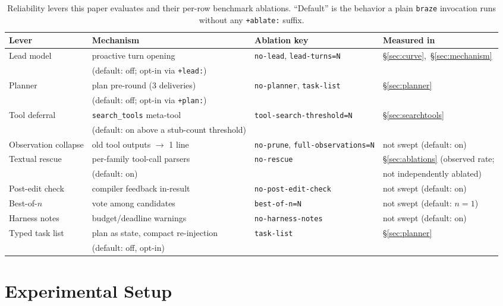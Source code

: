 \documentclass[smallcondensed,natbib]{svjour3}
\begin{document}
\begin{table}[t]
\centering\small
\caption{Reliability levers this paper evaluates and their per-row
benchmark ablations. ``Default'' is the behavior a plain \texttt{braze}
invocation runs without any \texttt{+ablate:} suffix.}
\label{tab:levers}
\begin{tabular}{llll}
\toprule
Lever & Mechanism & Ablation key & Measured in \\
\midrule
Lead model & proactive turn opening & \texttt{no-lead}, \texttt{lead-turns=N} & \S\ref{sec:curve},~\S\ref{sec:mechanism} \\
& (default: off; opt-in via \texttt{+lead:}) & & \\
Planner & plan pre-round (3 deliveries) & \texttt{no-planner}, \texttt{task-list} & \S\ref{sec:planner} \\
& (default: off; opt-in via \texttt{+plan:}) & & \\
Tool deferral & \texttt{search\_tools} meta-tool & \texttt{tool-search-threshold=N} & \S\ref{sec:searchtools} \\
& (default: on above a stub-count threshold) & & \\
Observation collapse & old tool outputs $\to$ 1 line & \texttt{no-prune}, \texttt{full-observations=N} & not swept (default: on) \\
Textual rescue & per-family tool-call parsers & \texttt{no-rescue} & \S\ref{sec:ablations} (observed rate; \\
& (default: on) & & not independently ablated) \\
Post-edit check & compiler feedback in-result & \texttt{no-post-edit-check} & not swept (default: on) \\
Best-of-$n$ & vote among candidates & \texttt{best-of-n=N} & not swept (default: $n{=}1$) \\
Harness notes & budget/deadline warnings & \texttt{no-harness-notes} & not swept (default: on) \\
Typed task list & plan as state, compact re-injection & \texttt{task-list} & \S\ref{sec:planner} \\
& (default: off, opt-in) & & \\
\bottomrule
\end{tabular}
\end{table}

\section{Experimental Setup}\label{sec:setup}
\end{document}
